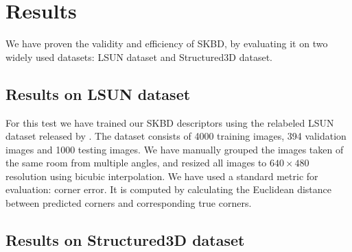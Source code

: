 \section{Results}

We have proven the validity and efficiency of SKBD, by evaluating it on two widely used datasets: LSUN dataset\cite{zhang2015large} and Structured3D dataset\cite{zheng2020structured3d}.

\subsection{Results on LSUN dataset}
For this test we have trained our SKBD descriptors using the relabeled LSUN dataset released by \cite{ren2017coarse}. The dataset consists of 4000 training images, 394 validation images and 1000 testing images. We have manually grouped the images taken of the same room from multiple angles, and resized all images to \( 640 \times 480 \) resolution using bicubic interpolation. We have used a standard metric for evaluation: corner error. It is computed by calculating the Euclidean distance between predicted corners and corresponding true corners.


\subsection{Results on Structured3D dataset}